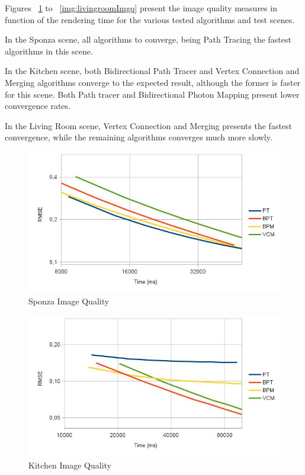 Figures ~\ref{img:sponzaImgq} to ~\ref{img:livingroomImgq} present the image quality measures in function of the rendering time for the various tested algorithms and test scenes.

In the Sponza scene, all algorithms to converge, being Path Tracing the fastest algorithms in this scene.

In the Kitchen scene, both Bidirectional Path Tracer and Vertex Connection and Merging algorithms converge to the expected result, although the former is faster for this scene. Both Path tracer and Bidirectional Photon Mapping present lower convergence rates.

In the Living Room scene, Vertex Connection and Merging presents the fastest convergence, while the remaining algorithms converges much more slowly.

\begin{figure}[H]
\centering
\includegraphics[width=0.8\linewidth]{img/sponzaImgq.jpg}
\caption{\label{img:sponzaImgq} Sponza Image Quality}
\end{figure}

\begin{figure}[H]
\centering
\includegraphics[width=0.8\linewidth]{img/kitchenImgq.jpg}
\caption{\label{img:kitchenImgq} Kitchen Image Quality}
\end{figure}

